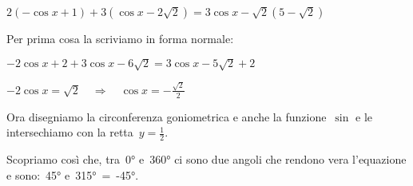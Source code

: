  \begin{esempio}
  $2 ( -\cos x +1) + 3 (\cos x -2 \sqrt{2}) = 3 \cos x -\sqrt{2} (5 
-\sqrt{2})$
  
  Per prima cosa la scriviamo in forma normale:
  
  $- 2 \cos x +2 + 3 \cos x -6 \sqrt{2} = 3 \cos x -5 \sqrt{2} +2$
  
  $-2 \cos x  = \sqrt{2} \quad \Rightarrow \quad \cos x  = 
-\frac{\sqrt{2}}{2}$
  
  Ora disegniamo la circonferenza goniometrica e anche la funzione~$\sin$ 
  e le intersechiamo con la retta~$y=\frac{1}{2}$.
  
 \vspace{-6pt}
  \begin{center}
\begin{inaccessibleblock}[Soluzione grafica dell'equazione: 
    $\cos x = \frac{\sqrt{2}}{2}$.]
    
\end{inaccessibleblock}
  \end{center}
  Scopriamo così che, tra~0° e~360° ci sono due angoli che rendono vera 
  l'equazione e sono:~45° e~315°~=~-45°. 
 \end{esempio}

